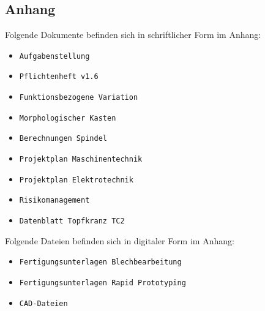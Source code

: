 \newpage
\begin{appendix}
\section{Anhang}
Folgende Dokumente befinden sich in schriftlicher Form im Anhang:

\begin{itemize}
	\item \verb|Aufgabenstellung|
	\item \verb|Pflichtenheft v1.6|	
	\item \verb|Funktionsbezogene Variation|
	\item \verb|Morphologischer Kasten|	
	\item \verb|Berechnungen Spindel|
	\item \verb|Projektplan Maschinentechnik|
	\item \verb|Projektplan Elektrotechnik|	
	\item \verb|Risikomanagement|	
	\item \verb|Datenblatt Topfkranz TC2|	
	
	
	
\end{itemize}

Folgende Dateien befinden sich in digitaler Form im Anhang:

\begin{itemize}
	\item \verb|Fertigungsunterlagen Blechbearbeitung|
	\item \verb|Fertigungsunterlagen Rapid Prototyping|
	\item \verb|CAD-Dateien|	
	
\end{itemize}



\end{appendix}